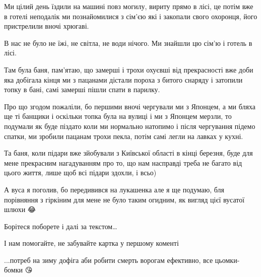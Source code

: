 Ми цілий день їздили на машині повз могилу, вириту прямо в лісі, це потім вже в
готелі неподалік ми познайомилися з сім'єю які і закопали свого охоронця, його
пристрелили вночі хрюгаві. 

В нас не було не їжі, не світла, не води нічого. Ми знайшли цю сім'ю і готель
в лісі. 

Там була баня, пам'ятаю, що замерші і трохи охуєвші від прекрасності вже доби
яка добігала кінця ми з пацанами дістали пороха з битого снаряду і затопили
топку в бані, самі замерші пішли спати в парилку.

Про що згодом пожаліли, бо першими вночі чергували ми з Японцем, а ми бляха
ще ті банщики і оскільки топка була на вулиці і ми з Японцем мерзли, то
подумали як буде піздато коли ми нормально натопимо і після чергування підемо
спатки, ми зробили пацанам трохи пекла, потім самі легли на лавках у кухні. 

Та баня, коли підари вже зйобували з Київської області в кінці березня, буде
для мене прекрасним нагадуванням про то, що нам насправді треба не багато від
цього життя, лише щоб всі підари здохли, і всьо) 

А вуса я поголив, бо передивився на лукашенка але я ще подумаю, бля
порівняння з гіркіним для мене не було таким огидним, як вигляд цієї вусатої
шлюхи 😂

Борітеся поборете і далі за текстом…

І нам помогайте, не забувайте картка у першому коменті

...потреб на зиму дофіга аби робити смерть ворогам ефективно, все цьомки- бомки 😘
